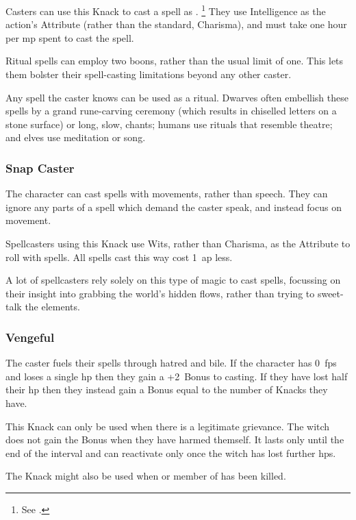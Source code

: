 \begin{multicols}{2}
Casters can use this Knack to cast a spell as .%
\footnote{See .}
They use Intelligence as the action's Attribute (rather than the standard, Charisma), and must take one hour per \gls{mp} spent to cast the spell.

Ritual spells can employ two \glspl{boon}, rather than the usual limit of one.
This lets them bolster their spell-casting limitations beyond any other caster.

Any spell the caster knows can be used as a ritual.
Dwarves often embellish these spells by a grand rune-carving ceremony (which results in chiselled letters on a stone surface) or long, slow, chants; humans use rituals that resemble theatre; and elves use meditation or song.

\subsubsection{Snap Caster}
\label{snapCaster}

The character can cast spells with movements, rather than speech.
They can ignore any parts of a spell which demand the caster speak, and instead focus on movement.

Spellcasters using this Knack use Wits, rather than Charisma, as the Attribute to roll with spells.
All spells cast this way cost 1~\gls{ap} less.

A lot of spellcasters rely solely on this type of magic to cast spells, focussing on their insight into grabbing the world's hidden flows, rather than trying to sweet-talk the elements.

\subsubsection{Vengeful}

The caster fuels their spells through hatred and bile.
If the character has 0~\glspl{fp} and loses a single \gls{hp} then they gain a +2~Bonus to \gls{casting}.
If they have lost half their \gls{hp} then they instead gain a Bonus equal to the number of Knacks they have.

This Knack can only be used when there is a legitimate grievance.
The \gls{witch} does not gain the Bonus when they have harmed themself.
It lasts only until the end of the \gls{interval} and can reactivate only once the \gls{witch} has lost further \glspl{hp}.

The Knack might also be used when  or member of  has been killed.


\end{multicols}
